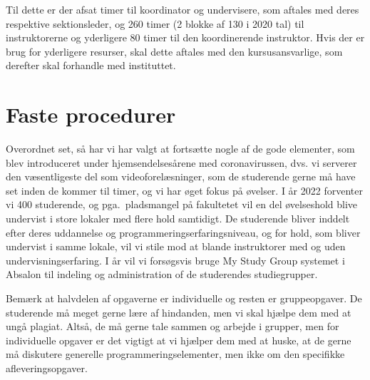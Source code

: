 \documentclass[a4paper]{article}
\begin{document}
Til dette er der afsat timer til koordinator og undervisere, som
aftales med deres respektive sektionsleder, og 260 timer (2 blokke af
130 i 2020 tal) til instruktorerne og yderligere 80 timer til den
koordinerende instruktor. Hvis der er brug for yderligere resurser,
skal dette aftales med den kursusansvarlige, som derefter skal
forhandle med instituttet.

\section{Faste procedurer}
Overordnet set, så har vi har valgt at fortsætte nogle af de gode
elementer, som blev introduceret under hjemsendelsesårene med
coronavirussen, dvs. vi serverer den væsentligeste del som
videoforelæsninger, som de studerende gerne må have set inden de
kommer til timer, og vi har øget fokus på øvelser. I år 2022 forventer
vi 400 studerende, og pga.\ pladsmangel på fakultetet vil en del
øvelseshold blive undervist i store lokaler med flere hold
samtidigt. De studerende bliver inddelt efter deres uddannelse og
programmeringserfaringsniveau, og for hold, som bliver undervist i
samme lokale, vil vi stile mod at blande instruktorer med og uden
undervisningserfaring. I år vil vi forsøgsvis bruge My Study Group
systemet i Absalon til indeling og administration of de studerendes
studiegrupper.

Bemærk at halvdelen af opgaverne er individuelle og resten er
gruppeopgaver. De studerende må meget gerne lære af hindanden, men vi
skal hjælpe dem med at ungå plagiat. Altså, de må gerne tale sammen og
arbejde i grupper, men for individuelle opgaver er det vigtigt at vi
hjælper dem med at huske, at de gerne må diskutere generelle
programmeringselementer, men ikke om den specifikke
afleveringsopgaver.
\end{document}
